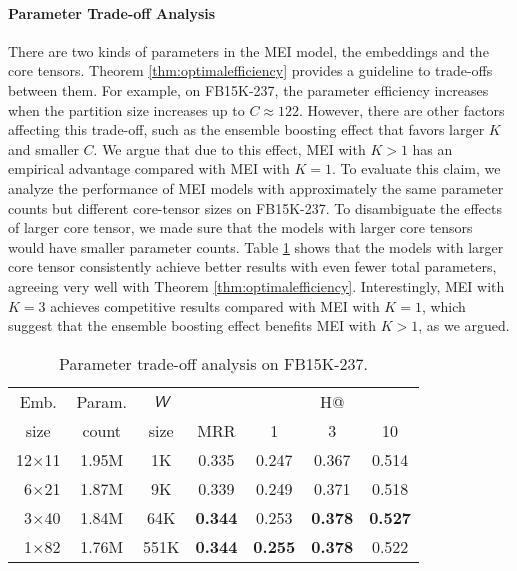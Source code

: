 \documentclass{ecai}
\newcommand{\tens}[1]{\bm{\mathsfit{#1}}}
\def\tW{{\tens{W}}}
\theoremstyle{plain}  \newtheorem{thm}{Theorem}  \newtheorem{lem}[thm]{Lemma}  \newtheorem{prop}[thm]{Proposition}
\theoremstyle{remark}  \newtheorem*{rem}{Remark}
\begin{document}
\paragraph{Parameter Trade-off Analysis}
There are two kinds of parameters in the MEI model, the embeddings and the core tensors. Theorem \ref{thm:optimalefficiency} provides a guideline to trade-offs between them. For example, on FB15K-237, the parameter efficiency increases when the partition size increases up to $ C \approx 122 $. However, there are other factors affecting this trade-off, such as the ensemble boosting effect that favors larger $ K $ and smaller $ C $. We argue that due to this effect, MEI with $ K > 1 $ has an empirical advantage compared with MEI with $ K = 1 $. To evaluate this claim, we analyze the performance of MEI models with approximately the same parameter counts but different core-tensor sizes on FB15K-237. To disambiguate the effects of larger core tensor, we made sure that the models with larger core tensors would have smaller parameter counts. Table \ref{tab:trade-off} shows that the models with larger core tensor consistently achieve better results with even fewer total parameters, agreeing very well with Theorem \ref{thm:optimalefficiency}. Interestingly, MEI with $ K = 3 $ achieves competitive results compared with MEI with $ K = 1 $, which suggest that the ensemble boosting effect benefits MEI with $ K > 1 $, as we argued.

\begin{table}\caption{Parameter trade-off analysis on FB15K-237.}
	\label{tab:trade-off}
	\centering	
	\begin{adjustbox}{max width=\columnwidth}
		\begin{tabular}{@{\extracolsep{0pt}}ccccccc}
			\toprule
			Emb. & Param. & $ \tW $ & & \multicolumn{3}{c}{{H@}}   \\
			size & count & size & MRR & 1 & 3 & 10 \\
			\hline
			12$ \times $11 & 1.95M & 1K & 0.335 & 0.247 & 0.367 & 0.514  \\
			\,\,\,6$ \times $21 & 1.87M & 9K & 0.339 & 0.249 & 0.371 & 0.518  \\
			\,\,\,3$ \times $40 & 1.84M & 64K & \textbf{0.344} & 0.253 & \textbf{0.378} & \textbf{0.527}  \\
			\,\,\,1$ \times $82 & 1.76M & 551K & \textbf{0.344} & \textbf{0.255} & \textbf{0.378} & 0.522  \\
			\bottomrule
		\end{tabular}
	\end{adjustbox}
\end{table}
\end{document}
